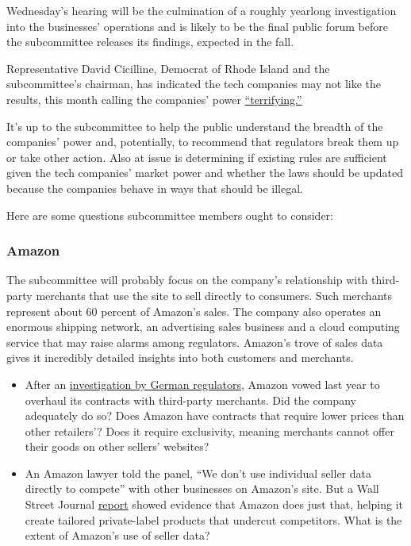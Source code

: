 Wednesday's hearing will be the culmination of a roughly yearlong
investigation into the businesses' operations and is likely to be the
final public forum before the subcommittee releases its findings,
expected in the fall.

Representative David Cicilline, Democrat of Rhode Island and the
subcommittee's chairman, has indicated the tech companies may not like
the results, this month calling the companies' power
\href{https://www.nytimes3xbfgragh.onion/2020/07/01/opinion/anti-trust-tech-hearing-facebook.html}{``terrifying.''}

It's up to the subcommittee to help the public understand the breadth of
the companies' power and, potentially, to recommend that regulators
break them up or take other action. Also at issue is determining if
existing rules are sufficient given the tech companies' market power and
whether the laws should be updated because the companies behave in ways
that should be illegal.

Here are some questions subcommittee members ought to consider:

\hypertarget{amazon}{%
\subsubsection{Amazon}\label{amazon}}

The subcommittee will probably focus on the company's relationship with
third-party merchants that use the site to sell directly to consumers.
Such merchants represent about 60 percent of Amazon's sales. The company
also operates an enormous shipping network, an advertising sales
business and a cloud computing service that may raise alarms among
regulators. Amazon's trove of sales data gives it incredibly detailed
insights into both customers and merchants.

\begin{itemize}
\tightlist
\item
  After an
  \href{https://www.cnbc.com/2019/07/17/amazon-in-deal-with-german-watchdog-to-overhaul-marketplace-terms.html}{investigation
  by German regulators}, Amazon vowed last year to overhaul its
  contracts with third-party merchants. Did the company adequately do
  so? Does Amazon have contracts that require lower prices than other
  retailers'? Does it require exclusivity, meaning merchants cannot
  offer their goods on other sellers' websites?
\end{itemize}

\begin{itemize}
\tightlist
\item
  An Amazon lawyer told the panel, ``We don't use individual seller data
  directly to compete'' with other businesses on Amazon's site. But a
  Wall Street Journal
  \href{https://www.wsj.com/articles/amazon-scooped-up-data-from-its-own-sellers-to-launch-competing-products-11587650015}{report}
  showed evidence that Amazon does just that, helping it create tailored
  private-label products that undercut competitors. What is the extent
  of Amazon's use of seller data?
\end{itemize}

